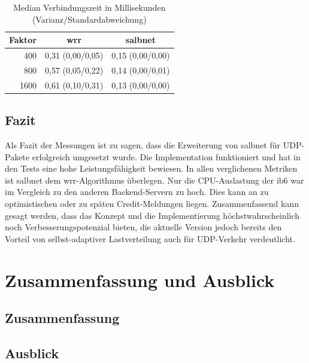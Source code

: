 \documentclass[a4paper, 12pt, BCOR10mm, DIV12, toc=bibliography, toc=listof, german]{scrbook}
\begin{document}
			\begin{table}
				\centering
				\begin{tabular}{|r|c|c|}\hline
					Faktor & wrr & salbnet \\\hline\hline
					400 & 0,31 (0,00/0,05) & 0,15 (0,00/0,00)\\
					800 & 0,57 (0,05/0,22) & 0,14 (0,00/0,01)\\
					1600 & 0,61 (0,10/0,31) & 0,13 (0,00/0,00)\\\hline
				\end{tabular}
				\caption{Median Verbindungszeit in Millisekunden (Varianz/Standardabweichung)}
				\label{tab:connect}
			\end{table}


		\section{Fazit} %
		\label{sec:Fazit}

		Als Fazit der Messungen ist zu sagen, dass die Erweiterung von salbnet für UDP-Pakete
		erfolgreich umgesetzt wurde. Die Implementation funktioniert und hat in den Tests eine hohe
		Leistungsfähigkeit bewiesen. In allen verglichenen Metriken ist salbnet dem wrr-Algorithmus
		überlegen. Nur die CPU-Auslastung der ib6 war im Vergleich zu den anderen Backend-Servern zu
		hoch. Dies kann an zu optimistischen oder zu späten Credit-Meldungen liegen. Zusammenfassend
		kann gesagt werden, dass das Konzept und die Implementierung höchstwahrscheinlich noch
		Verbesserungspotenzial bieten, die aktuelle Version jedoch bereits den Vorteil von
		selbst-adaptiver Lastverteilung auch für UDP-Verkehr verdeutlicht.



	\chapter{Zusammenfassung und Ausblick} %
	\label{cha:zusammenfassung}

		\section{Zusammenfassung} %
		\label{sec:zusammenfassung}
			

		\section{Ausblick} %
		\label{sec:ausblick}
\end{document}
